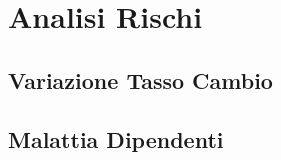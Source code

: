 \chapter[Analisi Rischi]{Analisi Rischi}

\section[Variazione Tasso Cambio]{Variazione Tasso Cambio}
	

\section[Malattia Dipendenti]{Malattia Dipendenti}
	